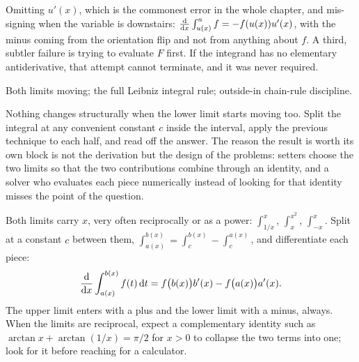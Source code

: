 \begin{trap}
Omitting $u'(x)$, which is the commonest error in the whole chapter, and mis-signing when the variable is downstairs: $\frac{\mathrm{d}}{\mathrm{d}x}\int_{u(x)}^{a}f=-f(u(x))u'(x)$, with the minus coming from the orientation flip and not from anything about $f$. A third, subtler failure is trying to evaluate $F$ first. If the integrand has no elementary antiderivative, that attempt cannot terminate, and it was never required.
\end{trap}

\begin{seealsob}Both limits moving; the full Leibniz integral rule; outside-in chain-rule discipline.\end{seealsob}

Nothing changes structurally when the lower limit starts moving too. Split the integral at any convenient constant $c$ inside the interval, apply the previous technique to each half, and read off the answer. The reason the result is worth its own block is not the derivation but the design of the problems: setters choose the two limits so that the two contributions combine through an identity, and a solver who evaluates each piece numerically instead of looking for that identity misses the point of the question.

\cue Both limits carry $x$, very often reciprocally or as a power: $\int_{1/x}^{x}$, $\int_{x}^{x^{2}}$, $\int_{-x}^{x}$.
\method Split at a constant $c$ between them, $\int_{a(x)}^{b(x)}=\int_{c}^{b(x)}-\int_{c}^{a(x)}$, and differentiate each piece:
\[
\frac{\mathrm{d}}{\mathrm{d}x}\int_{a(x)}^{b(x)}f(t)\,\mathrm{d} t=f\bigl(b(x)\bigr)b'(x)-f\bigl(a(x)\bigr)a'(x).
\]
The upper limit enters with a plus and the lower limit with a minus, always. When the limits are reciprocal, expect a complementary identity such as $\arctan x+\arctan(1/x)=\pi/2$ for $x>0$ to collapse the two terms into one; look for it before reaching for a calculator.

